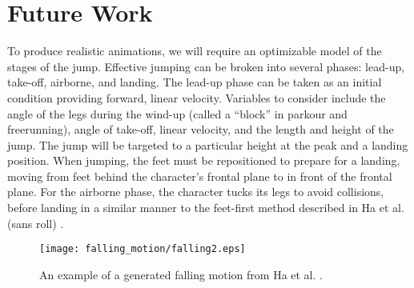 \documentclass[landscape,26pt]{sciposter}
\begin{document}
\begin{minipage}[t]{14in}
	
	\section*{Future Work}
		To produce realistic animations, we will require an optimizable model of the stages of the jump.  Effective jumping can be broken into several phases: lead-up, take-off, airborne, and landing.  The lead-up phase can be taken as an initial condition providing forward, linear velocity.  Variables to consider include the angle of the legs during the wind-up (called a ``block'' in parkour and freerunning), angle of take-off, linear velocity, and the length and height of the jump.  The jump will be targeted to a particular height at the peak and a landing position.  When jumping, the feet must be repositioned to prepare for a landing, moving from feet behind the character's frontal plane to in front of the frontal plane.  For the airborne phase, the character tucks its legs to avoid collisions, before landing in a similar manner to the feet-first method described in Ha et al. (sans roll) \cite{falling_landing}.
		\vspace{0.3in}
		\begin{figure}
			\centering
			\texttt{[image: falling\_motion/falling2.eps]}
			\caption{An example of a generated falling motion from Ha et al. \cite{falling_landing}.}		
		\end{figure}
		
	\vspace{0.3in}

	{\small
	
	\nocite{muscle_based_bipeds}
	\nocite{anim_human_athletics}
	\nocite{composable_controllers}
	\nocite{soft_contacts}
	\nocite{falling_landing}
	\nocite{vball_footwork_block}
	\nocite{static_block_jumps}
	\nocite{inter_physics_anim}
	\nocite{opt_motion_synth}
	\nocite{motion_intentions}
	
	}
\end{minipage}
\end{document}
